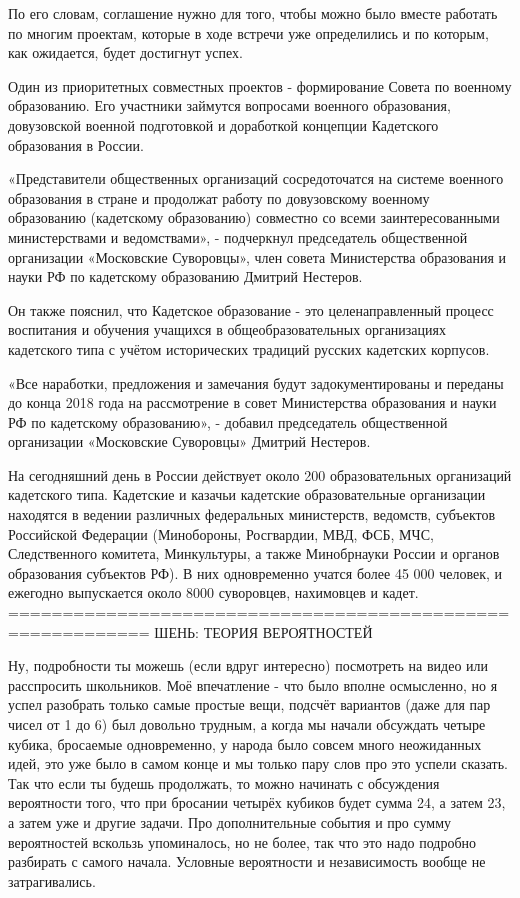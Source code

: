 По его словам, соглашение нужно для того, чтобы можно было вместе работать по многим проектам, которые в ходе встречи уже определились и по которым, как ожидается, будет достигнут успех. 

Один из приоритетных совместных проектов - формирование Совета по военному образованию. Его участники займутся вопросами военного образования, довузовской военной подготовкой и доработкой концепции Кадетского образования в России.

«Представители общественных организаций сосредоточатся на системе военного образования в стране и продолжат работу по довузовскому военному образованию (кадетскому образованию) совместно со всеми заинтересованными министерствами и ведомствами», - подчеркнул председатель общественной организации «Московские Суворовцы», член совета Министерства образования и науки РФ по кадетскому образованию Дмитрий Нестеров. 

Он также пояснил, что Кадетское образование - это целенаправленный процесс воспитания и обучения учащихся в общеобразовательных организациях кадетского типа с учётом исторических традиций русских кадетских корпусов.

«Все наработки, предложения и замечания будут задокументированы и переданы до конца 2018 года на рассмотрение в совет Министерства образования и науки РФ по кадетскому образованию», - добавил председатель общественной организации «Московские Суворовцы» Дмитрий Нестеров. 

На сегодняшний день в России действует около 200 образовательных организаций кадетского типа. Кадетские и казачьи кадетские образовательные организации находятся в ведении различных федеральных министерств, ведомств, субъектов Российской Федерации (Минобороны, Росгвардии, МВД, ФСБ, МЧС, Следственного комитета, Минкультуры, а также Минобрнауки России и органов образования субъектов РФ). В них одновременно учатся более 45 000 человек, и ежегодно выпускается около 8000 суворовцев, нахимовцев и кадет. 
===========================================================
ШЕНЬ: ТЕОРИЯ ВЕРОЯТНОСТЕЙ

Ну, подробности ты можешь (если вдруг интересно) посмотреть на видео или 
расспросить школьников. Моё впечатление - что было вполне осмысленно, но 
я успел разобрать только самые простые вещи, подсчёт вариантов (даже для 
пар чисел от 1 до 6) был довольно трудным, а когда мы начали обсуждать 
четыре кубика, бросаемые одновременно, у народа было совсем много 
неожиданных идей, это уже было в самом конце и мы только пару слов про 
это успели сказать. Так что если ты будешь продолжать, то можно начинать 
с обсуждения вероятности того, что при бросании четырёх кубиков будет 
сумма 24, а затем 23, а затем уже и другие задачи. Про дополнительные 
события и про сумму вероятностей вскользь упоминалось, но не более, так 
что это надо подробно разбирать с самого начала. Условные вероятности и 
независимость вообще не затрагивались.


